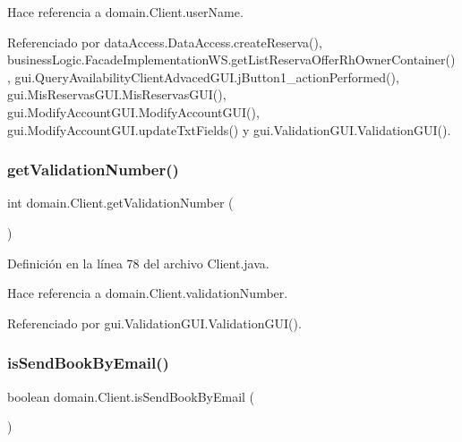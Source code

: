 Hace referencia a domain.\+Client.\+user\+Name.



Referenciado por data\+Access.\+Data\+Access.\+create\+Reserva(), business\+Logic.\+Facade\+Implementation\+W\+S.\+get\+List\+Reserva\+Offer\+Rh\+Owner\+Container(), gui.\+Query\+Availability\+Client\+Advaced\+G\+U\+I.\+j\+Button1\+\_\+action\+Performed(), gui.\+Mis\+Reservas\+G\+U\+I.\+Mis\+Reservas\+G\+U\+I(), gui.\+Modify\+Account\+G\+U\+I.\+Modify\+Account\+G\+U\+I(), gui.\+Modify\+Account\+G\+U\+I.\+update\+Txt\+Fields() y gui.\+Validation\+G\+U\+I.\+Validation\+G\+U\+I().

\mbox{\label{classdomain_1_1_client_a423c12788bfb3d265506bad3de79c771}} 
\subsubsection{\texorpdfstring{getValidationNumber()}{getValidationNumber()}}
{\footnotesize\ttfamily int domain.\+Client.\+get\+Validation\+Number (\begin{DoxyParamCaption}{ }\end{DoxyParamCaption})}



Definición en la línea 78 del archivo Client.\+java.


\begin{DoxyCode}{0}

\end{DoxyCode}


Hace referencia a domain.\+Client.\+validation\+Number.



Referenciado por gui.\+Validation\+G\+U\+I.\+Validation\+G\+U\+I().

\mbox{\label{classdomain_1_1_client_aac608259550fa807f8de3b1e08d30e77}} 
\subsubsection{\texorpdfstring{isSendBookByEmail()}{isSendBookByEmail()}}
{\footnotesize\ttfamily boolean domain.\+Client.\+is\+Send\+Book\+By\+Email (\begin{DoxyParamCaption}{ }\end{DoxyParamCaption})}



